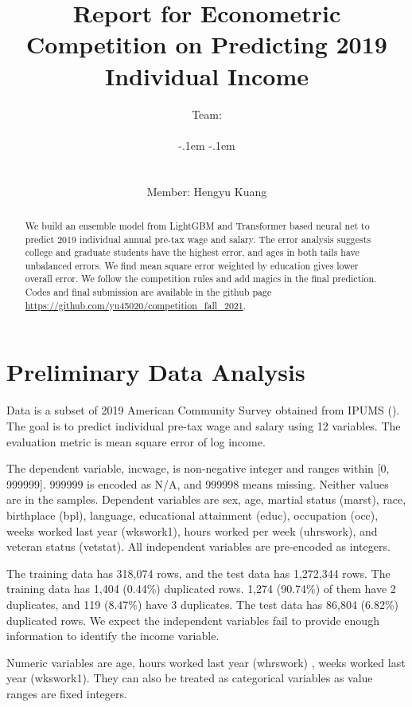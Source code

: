 \documentclass[11pt, letter,twocolumn]{article}
\newcommand{\teamname}{
\rule[1.3ex]{.25em}{1pt}\kern-.1em%
\reflectbox{\small\ttfamily/}%
\kern-.1em\rule[-.2ex]{.4em}{1pt}%
\makebox{{\raisebox{.15em}{{\large\textcircled{
					\ttfamily\kern-.35em%
					\rotatebox[origin=t]{-120}{\bfseries\scriptsize`\kern-.3ex`}%
					\kern-.15em\rotatebox{-45}{\bfseries\scriptsize)}}}}%
		\rule[-.2ex]{.4em}{1pt}\kern-.1em{\small\ttfamily/}%
		\kern-.1em\rule[1.3ex]{.25em}{1pt}}} 

}
\begin{document}
\title{Report for Econometric Competition on Predicting 2019 Individual Income}
\author{Team:  \teamname \\ Member: Hengyu Kuang}
\maketitle

\begin{abstract}
We build an ensemble model from LightGBM and Transformer based neural net to predict 2019 individual annual pre-tax wage and salary. The error analysis suggests college and graduate students have the highest error, and ages in both tails have unbalanced errors. We find    mean square error weighted by education   gives lower overall error. We follow the competition rules and add magics in the final prediction. Codes and final submission are available in the github page \href{https://github.com/yu45020/competition_fall_2021}{https://github.com/yu45020/competition\_fall\_2021}. 
\end{abstract}



\section{Preliminary Data Analysis }
Data is a subset of 2019 American Community Survey obtained from IPUMS (\cite{ruggles_ipums_2021}). The goal is to predict individual pre-tax wage and salary  using 12 variables. The evaluation metric is mean square error of log income. 

The dependent variable, incwage, is non-negative integer and ranges within [0, 999999].  999999 is encoded as  N/A, and  999998 means missing. Neither values are in the samples. Dependent variables are sex, age, martial status (marst), race, birthplace (bpl), language, educational attainment (educ), occupation (occ), weeks worked last year (wkswork1), hours worked per week (uhrswork), and veteran status (vetstat). All independent variables are pre-encoded as integers. 
% 

The training data has 318,074 rows, and the test data has 1,272,344 rows. The training data has 1,404 (0.44\%) duplicated rows. 1,274 (90.74\%) of them  have 2 duplicates, and 119 (8.47\%) have 3 duplicates. The test data has 86,804 (6.82\%) duplicated rows. We expect the independent variables fail to provide enough information to identify the income variable. 

Numeric variables are age, hours worked last year (whrswork) , weeks worked last year (wkswork1). They can also be treated as categorical variables as value ranges are fixed integers.
\end{document}
